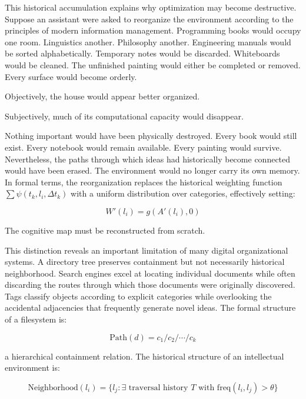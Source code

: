 \documentclass[12pt,oneside]{article}
\theoremstyle{remark}
\begin{document}
This historical accumulation explains why optimization may become destructive. Suppose an assistant were asked to reorganize the environment according to the principles of modern information management. Programming books would occupy one room. Linguistics another. Philosophy another. Engineering manuals would be sorted alphabetically. Temporary notes would be discarded. Whiteboards would be cleaned. The unfinished painting would either be completed or removed. Every surface would become orderly.

Objectively, the house would appear better organized.

Subjectively, much of its computational capacity would disappear.

Nothing important would have been physically destroyed. Every book would still exist. Every notebook would remain available. Every painting would survive. Nevertheless, the paths through which ideas had historically become connected would have been erased. The environment would no longer carry its own memory. In formal terms, the reorganization replaces the historical weighting function $\sum \psi(t_k, l_i, \Delta t_k)$ with a uniform distribution over categories, effectively setting:

\begin{equation}
W'(l_i) = g\left(A'(l_i), 0\right)
\end{equation}

The cognitive map must be reconstructed from scratch.

This distinction reveals an important limitation of many digital organizational systems. A directory tree preserves containment but not necessarily historical neighborhood. Search engines excel at locating individual documents while often discarding the routes through which those documents were originally discovered. Tags classify objects according to explicit categories while overlooking the accidental adjacencies that frequently generate novel ideas. The formal structure of a filesystem is:

\begin{equation}
\text{Path}(d) = c_1/c_2/\cdots/c_k
\end{equation}

a hierarchical containment relation. The historical structure of an intellectual environment is:

\begin{equation}
\text{Neighborhood}(l_i) = \{l_j : \exists \text{ traversal history } T \text{ with } \text{freq}(l_i, l_j) > \theta\}
\end{equation}
\end{document}
